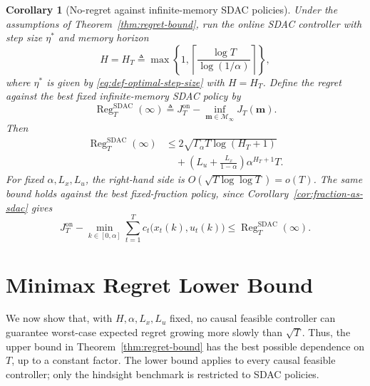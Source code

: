 \documentclass[journal]{IEEEtran}
\newtheorem{corollary}{Corollary}
\theoremstyle{remark}
\newcommand{\RegSDAC}[1]{\operatorname{Reg}_{#1}^{\mathrm{SDAC}}}
\begin{document}
\begin{corollary}[No-regret against infinite-memory SDAC policies]
\label{cor:regret-vs-infinite-sdac}
Under the assumptions of Theorem~\ref{thm:regret-bound}, run the online SDAC
controller with step size $\eta^*$ and memory horizon
\begin{equation}
\label{eq:def-memory-horizon}
H=H_T
\triangleq
\max\!\left\{1,\left\lceil\frac{\log T}{\log(1/\alpha)}\right\rceil\right\},
\end{equation}
where $\eta^*$ is given by \eqref{eq:def-optimal-step-size} with $H=H_T$.
Define the regret against the best fixed
infinite-memory SDAC policy by
\begin{equation}
\label{eq:def-infinite-regret}
\RegSDAC{T}(\infty)
\triangleq
J_T^{\mathrm{on}}-\inf_{\mathbf{m}\in\mathcal{M}_\infty}J_T(\mathbf{m}).
\end{equation}
Then
\begin{equation}
\label{eq:infinite-sdac-regret-bound}
\begin{aligned}
\RegSDAC{T}(\infty)
&\le
2\sqrt{\Gamma_\alpha T\log(H_T+1)}\\
&\quad+
\left(L_u+\frac{L_x}{1-\alpha}\right)\alpha^{H_T+1}T.
\end{aligned}
\end{equation}
For fixed $\alpha,L_x,L_u$, the right-hand side is
$O\!\left(\sqrt{T\log\log T}\right)=o(T)$.
The same bound holds against the best fixed-fraction policy, since
Corollary~\ref{cor:fraction-as-sdac} gives
\begin{equation}
\label{eq:fraction-regret-comparison}
J_T^{\mathrm{on}}
-\min_{k\in[0,\alpha]}\sum_{t=1}^T c_t\bigl(x_t(k),u_t(k)\bigr)
\le\RegSDAC{T}(\infty).
\end{equation}
\end{corollary}

\section{Minimax Regret Lower Bound}
\label{sec:regret-lower-bound}

We now show that, with $H,\alpha,L_x,L_u$ fixed, no causal feasible
controller can guarantee worst-case expected regret growing more slowly
than $\sqrt{T}$. Thus, the upper bound in
Theorem~\ref{thm:regret-bound} has the best possible dependence on $T$,
up to a constant factor. The lower bound applies to every causal feasible
controller; only the hindsight benchmark is restricted to SDAC policies.
\end{document}
